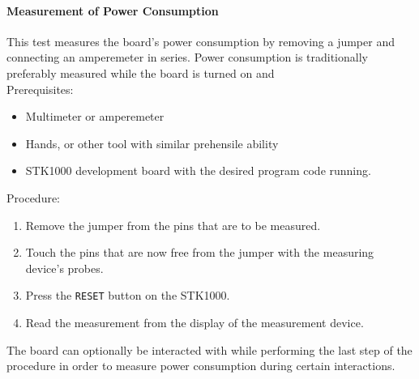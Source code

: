 \paragraph{Measurement of Power Consumption}
This test measures the board's power consumption by removing a jumper and connecting an amperemeter in series.
Power consumption is traditionally preferably measured while the board is turned on and 
\\
Prerequisites:
\begin{itemize}
	\item{Multimeter or amperemeter}
	\item{Hands, or other tool with similar prehensile ability}
    \item{STK1000 development board with the desired program code running.}
\end{itemize}
Procedure:
\begin{enumerate}
    \item{Remove the jumper from the pins that are to be measured.}
    \item{Touch the pins that are now free from the jumper with the measuring device's probes.}
	\item{Press the \texttt{RESET} button on the STK1000.}
    \item{Read the measurement from the display of the measurement device.}
\end{enumerate}
The board can optionally be interacted with while performing the last step of the procedure in order to measure power consumption during certain interactions.
